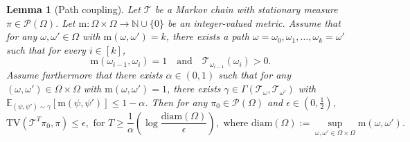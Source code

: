 \documentclass[11pt]{article}
\newtheorem{lemma}{Lemma}
\newcommand{\eps}{\epsilon}
\newcommand{\half}{\frac{1}{2}}
\newcommand{\1}{\mathbf{1}}
\newcommand{\0}{\mathbf{0}}
\newcommand{\Par}[1]{\left(#1\right)}
\newcommand{\TV}[1]{\mathrm{TV}\left(#1\right)}
\newcommand{\met}{\mathrm{m}}
\newcommand{\calP}{{\mathcal{P}}}
\newcommand{\calT}{{\mathcal{T}}}
\begin{document}
\begin{lemma}[Path coupling]
    \label{lem:mixing_time_path coupling}
Let $\calT$ be a Markov chain with stationary measure $\pi \in \calP(\Omega)$.
Let $\met:\Omega\times \Omega\to \mathbb{N} \cup \{0\}$ be an integer-valued metric.
Assume that for any $\omega ,\omega'\in \Omega$ with $\met(\omega,\omega')=k$, there exists a path
$\omega=\omega_0,\omega_1,\ldots,\omega_k=\omega'$ such that for every $i\in[k]$,
\begin{equation}\label{eq:path_conds}
\met(\omega_{i-1},\omega_i)=1
\quad\text{and}\quad
\calT_{\omega_{i-1}}(\omega_i)>0.
\end{equation}
Assume furthermore that there exists $\alpha \in (0, 1)$ such that for any $(\omega,\omega')\in \Omega \times \Omega$ with $\met(\omega,\omega')=1$, there exists $\gamma \in \Gamma(\calT_\omega,\calT_{\omega'})$ with
$
\mathbb{E}_{(\psi, \psi') \sim \gamma}[\met(\psi, \psi')]\le 1-\alpha$.
Then for any $\pi_0 \in \calP(\Omega)$ and $\eps \in (0, \half)$,
\[\TV{\calT^T \pi_0, \pi} \le \eps, \text{ for } T \ge \frac 1 \alpha\Par{\log\frac{\mathrm{diam}(\Omega)}{\eps}},\text{ where } \mathrm{diam}(\Omega):=\sup_{\omega,\omega'\in\Omega \times \Omega} \met(\omega,\omega').\]
\end{lemma}
\end{document}
